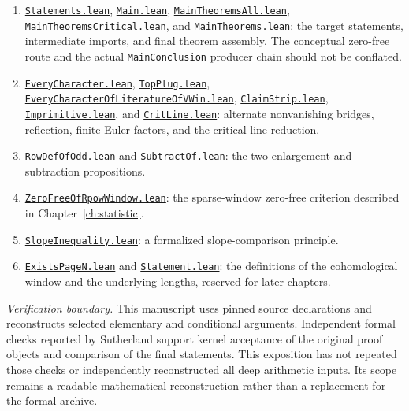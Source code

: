 \documentclass[11pt,openany,oneside]{scrbook}
\theoremstyle{definition}
\theoremstyle{remark}
\newcommand{\baseurl}{https://github.com/CocoSgt/riemann-hypothesis-lean/blob/7cbf7a0c32fca1badf05931879a37c3f8a2b03b4/}
\newcommand{\sourcefile}[2]{\href{\baseurl#1}{\texttt{#2}}}
\begin{document}
\begin{enumerate}
\item \sourcefile{src/Statements.lean}{Statements.lean}, \sourcefile{src/Main.lean}{Main.lean}, \sourcefile{src/Supplements/Kernels/MainTheoremsAll.lean}{MainTheoremsAll.lean}, \sourcefile{src/Supplements/Kernels/MainTheoremsCritical.lean}{MainTheoremsCritical.lean}, and \sourcefile{src/Supplements/Kernels/MainTheorems.lean}{MainTheorems.lean}: the target statements, intermediate imports, and final theorem assembly. The conceptual zero-free route and the actual \texttt{MainConclusion} producer chain should not be conflated.
\item \sourcefile{src/Development/AutomorphicArithmetic/CharacterBoxes/EveryCharacter.lean}{EveryCharacter.lean}, \sourcefile{src/Development/AutomorphicArithmetic/ThetaCorrespondence/ThetaPairLifts/ThirdPlaceSeries/TopPlug.lean}{TopPlug.lean}, \sourcefile{src/Development/AutomorphicArithmetic/ThetaCorrespondence/ThetaPairLifts/ThirdPlaceSeries/EveryCharacterOfLiteratureOfVWin.lean}{EveryCharacterOfLiteratureOfVWin.lean}, \sourcefile{src/Development/AutomorphicArithmetic/CharacterBoxes/ClaimStrip.lean}{ClaimStrip.lean}, \sourcefile{src/Development/AutomorphicArithmetic/CharacterBoxes/Imprimitive.lean}{Imprimitive.lean}, and \sourcefile{src/Formalism/GammaFactorNonvanishing/CritLine.lean}{CritLine.lean}: alternate nonvanishing bridges, reflection, finite Euler factors, and the critical-line reduction.
\item \sourcefile{src/Development/AutomorphicArithmetic/Foundations/GaloisRepresentations/ThetaParseval/SplitLineSubtraction/RowDefOfOdd.lean}{RowDefOfOdd.lean} and \sourcefile{src/Development/AutomorphicArithmetic/Foundations/GaloisRepresentations/ThetaParseval/SplitLineSubtraction/SubtractOf.lean}{SubtractOf.lean}: the two-enlargement and subtraction propositions.
\item \sourcefile{src/Development/AutomorphicArithmetic/DedekindLFunctions/LandauTheorems/ZeroFreeOfRpowWindow.lean}{ZeroFreeOfRpowWindow.lean}: the sparse-window zero-free criterion described in Chapter~\ref{ch:statistic}.
\item \sourcefile{src/Formalism/LatticeSlopes/LatticeSlopesProofs/SlopeInequality.lean}{SlopeInequality.lean}: a formalized slope-comparison principle.
\item \sourcefile{src/Development/AutomorphicArithmetic/CharacterBoxes/ExistsPageN.lean}{ExistsPageN.lean} and \sourcefile{src/Formalism/GaloisCohomology/Statement.lean}{Statement.lean}: the definitions of the cohomological window and the underlying lengths, reserved for later chapters.
\end{enumerate}
\noindent\textit{Verification boundary.} This manuscript uses pinned source declarations and reconstructs selected elementary and conditional arguments. Independent formal checks reported by Sutherland support kernel acceptance of the original proof objects and comparison of the final statements. This exposition has not repeated those checks or independently reconstructed all deep arithmetic inputs. Its scope remains a readable mathematical reconstruction rather than a replacement for the formal archive.
\end{document}
